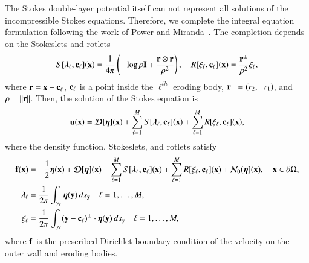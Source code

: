 \documentclass[preprint, 10pt]{elsarticle}
\begin{document}
The Stokes double-layer potential itself can not represent all solutions
of the incompressible Stokes equations.  Therefore, we complete the
integral equation formulation following the work of Power and
Miranda~\cite{pow-mir1987}.  The completion depends on the Stokeslets
and rotlets
\begin{align}
  S[{\boldsymbol\lambda}_\ell,{\mathbf{c}}_\ell]({\mathbf{x}}) = \frac{1}{4\pi} \left( 
    -\log \rho {\mathbf{I}} + \frac{{\mathbf{r}} \otimes {\mathbf{r}}}{\rho^2} \right), \quad
  R[\xi_\ell,{\mathbf{c}}_\ell]({\mathbf{x}}) = \frac{{\mathbf{r}}^\perp}{\rho^2} \xi_\ell,
\end{align}
where ${\mathbf{r}} = {\mathbf{x}} - {\mathbf{c}}_\ell$, ${\mathbf{c}}_\ell$ is a point inside the
$\ell^{th}$ eroding body, ${\mathbf{r}}^\perp = (r_2,-r_1)$, and $\rho =
\|{\mathbf{r}}\|$.  Then, the solution of the Stokes equation is
\begin{align}
  {\mathbf{u}}({\mathbf{x}}) = {\boldsymbol{\mathcal D}}[{\boldsymbol\eta}]({\mathbf{x}}) + 
    \sum_{\ell=1}^M S[{\boldsymbol\lambda}_\ell,{\mathbf{c}}_\ell]({\mathbf{x}}) + 
    \sum_{\ell=1}^M R[\xi_\ell,{\mathbf{c}}_\ell]({\mathbf{x}}),
\end{align}
where the density function, Stokeslets, and rotlets satisfy
\begin{align}
  {\mathbf{f}}({\mathbf{x}}) &= -\frac{1}{2}{\boldsymbol\eta}({\mathbf{x}}) + {\boldsymbol{\mathcal D}}[{\boldsymbol\eta}]({\mathbf{x}}) + 
    \sum_{\ell=1}^M S[{\boldsymbol\lambda}_\ell,{\mathbf{c}}_\ell]({\mathbf{x}}) + 
    \sum_{\ell=1}^M R[\xi_\ell,{\mathbf{c}}_\ell]({\mathbf{x}}) +
    {\mathcal{N}}_0({\boldsymbol\eta}]({\mathbf{x}}), \quad {\mathbf{x}} \in {\partial}\Omega, \\
  {\boldsymbol\lambda}_\ell &= \frac{1}{2\pi} \int_{\gamma_\ell} 
    {\boldsymbol\eta}({\mathbf{y}})\, ds_{\mathbf{y}} \quad \ell = 1,\ldots,M, \\
  \xi_\ell &= \frac{1}{2\pi} \int_{\gamma_\ell}
    ({\mathbf{y}} - {\mathbf{c}}_\ell)^\perp \cdot {\boldsymbol\eta}({\mathbf{y}})\, ds_{\mathbf{y}} 
    \quad \ell = 1,\ldots,M,
\end{align}
where ${\mathbf{f}}$ is the prescribed Dirichlet boundary condition of the
velocity on the outer wall and eroding bodies.

\end{document}
